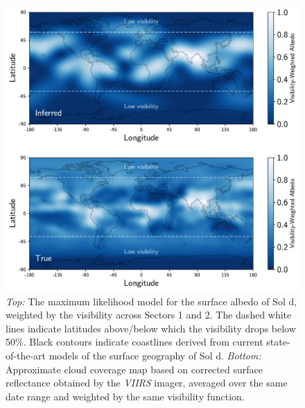 \documentclass[modern]{aastex62}
\begin{document}
\begin{figure}[p!]
    \begin{centering}
    \includegraphics[width=\linewidth]{figures/map.pdf}
    \caption{\label{fig:map}
             \emph{Top:} The maximum likelihood model for the surface albedo
             of Sol d, weighted by the visibility across Sectors 1 and 2. The
             dashed white lines indicate latitudes above/below which the
             visibility drops below 50\%. Black contours indicate coastlines
             derived from current state-of-the-art models of the surface geography 
             of Sol d.
             \emph{Bottom:} Approximate cloud coverage map based on corrected
             surface reflectance obtained by the
             \emph{VIIRS} imager, averaged over the same date range and weighted
             by the same visibility function.
             }
    \end{centering}
\end{figure}
\end{document}
